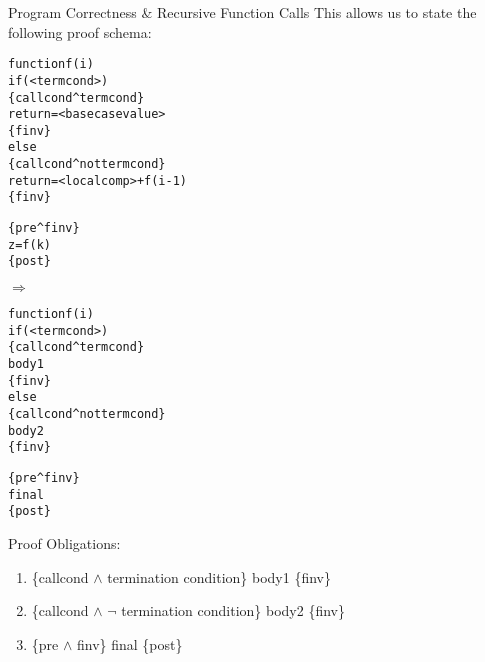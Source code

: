 \documentclass{beamer}
\begin{document}
\begin{frame}[fragile]{Program Correctness \& Recursive Function Calls}
\scriptsize
This allows us to state the following proof schema:
\vspace{.1in}

\begin{minipage}{2in}
\tiny
\begin{alltt}
function f (i)  
   if (<term cond>)
      {\rm\{callcond ^ term cond\}}
      return = <base case value>
      {\rm\{finv\}}
   else
      {\rm\{callcond ^ not term cond\}}
      return = <local comp> + f(i-1)
      {\rm\{finv\}}

{\rm\{pre ^ finv\}}
z = f(k)  
{\rm\{post\}}
\end{alltt}
\end{minipage}
$\Rightarrow$
\begin{minipage}{1.5in}
\tiny
\begin{alltt}
function f (i)  
   if (<term cond>)
      {\rm\{callcond ^ term cond\}}
      body1
      {\rm\{finv\}}
   else
      {\rm\{callcond ^ not term cond\}}
      body2
      {\rm\{finv\}}

{\rm\{pre ^ finv\}}
final  
{\rm\{post\}}
\end{alltt}
\end{minipage}

\vspace{.2in}

Proof Obligations:
\begin{enumerate}
\item \{callcond $\wedge$ termination condition\} body1 \{finv\}
\item \{callcond $\wedge$ $\neg$ termination condition\} body2 \{finv\}
\item \{pre $\wedge$ finv\} final \{post\}
\end{enumerate}
\end{frame}
\end{document}
